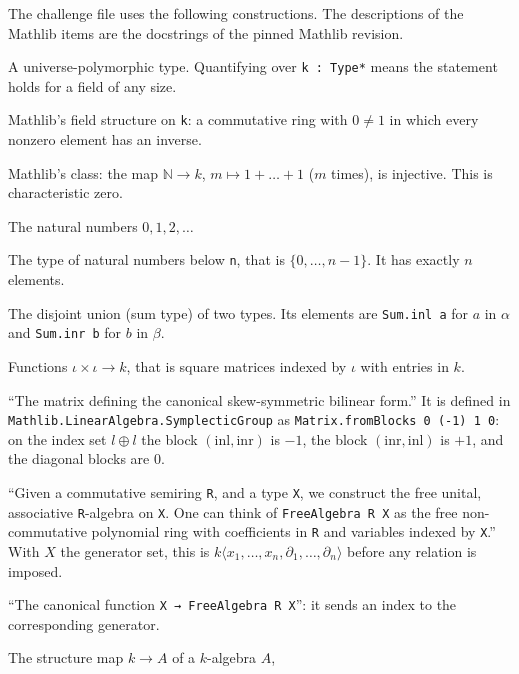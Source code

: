 \documentclass[11pt,a4paper]{article}
\theoremstyle{definition}
\theoremstyle{plain}
\newcommand{\lean}[1]{\texttt{#1}}
\begin{document}
The challenge file uses the following constructions. The descriptions of the
Mathlib items are the docstrings of the pinned Mathlib revision.

\begin{description}\sloppy
\item[\lean{Type*}] A universe-polymorphic type. Quantifying over
  \lean{k : Type*} means the statement holds for a field of any size.
\item[\lean{Field k}] Mathlib's field structure on \lean{k}: a commutative
  ring with $0\ne 1$ in which every nonzero element has an inverse.
\item[\lean{CharZero k}] Mathlib's class: the map $\mathbb{N}\to k$,
  $m\mapsto 1+\dots+1$ ($m$ times), is injective. This is characteristic zero.
\item[\lean{$\mathbb{N}$}] The natural numbers $0,1,2,\dots$
\item[\lean{Fin n}] The type of natural numbers below \lean{n}, that is
  $\{0,\dots,n-1\}$. It has exactly $n$ elements.
\item[\lean{$\alpha$ $\oplus$ $\beta$}] The disjoint union (sum type) of two
  types. Its elements are \lean{Sum.inl a} for $a$ in $\alpha$ and
  \lean{Sum.inr b} for $b$ in $\beta$.
\item[\lean{Matrix $\iota$ $\iota$ k}] Functions $\iota\times\iota\to k$, that is
  square matrices indexed by $\iota$ with entries in $k$.
\item[\lean{Matrix.J l R}] ``The matrix defining the canonical skew-symmetric
  bilinear form.'' It is defined in \lean{Mathlib.LinearAlgebra.SymplecticGroup}
  as \lean{Matrix.fromBlocks 0 (-1) 1 0}: on the index set
  $l\oplus l$ the block $(\mathrm{inl},\mathrm{inr})$ is $-1$, the block
  $(\mathrm{inr},\mathrm{inl})$ is $+1$, and the diagonal blocks are $0$.
\item[\lean{FreeAlgebra k X}] ``Given a commutative semiring \lean{R}, and a
  type \lean{X}, we construct the free unital, associative \lean{R}-algebra on
  \lean{X}. One can think of \lean{FreeAlgebra R X} as the free
  non-commutative polynomial ring with coefficients in \lean{R} and variables
  indexed by \lean{X}.'' With $X$ the generator set, this is
  $k\langle x_1,\dots,x_n,\partial_1,\dots,\partial_n\rangle$ before any
  relation is imposed.
\item[\lean{FreeAlgebra.$\iota$ k}] ``The canonical function
  \lean{X → FreeAlgebra R X}'': it sends an index to the corresponding
  generator.
\item[\lean{algebraMap k A}] The structure map $k\to A$ of a $k$-algebra $A$,

\end{description}
\end{document}
